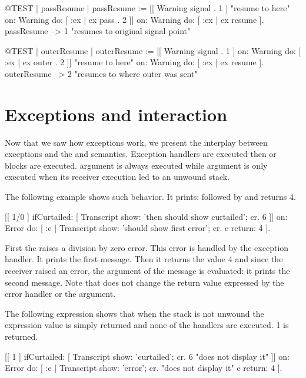 \begin{code}{@TEST | passResume |}
passResume := [[ Warning signal . 1 ]    "resume to here"
	on: Warning
	do: [ :ex | ex pass . 2 ]]
		on: Warning
		do: [ :ex | ex resume ].
passResume --> 1    "resumes to original signal point"
\end{code}

\begin{code}{@TEST | outerResume |}
outerResume := [[ Warning signal . 1 ]
	on: Warning
	do: [ :ex | ex outer . 2 ]]    "resume to here"
		on: Warning
		do: [ :ex | ex resume ].
outerResume --> 2    "resumes to where outer was sent"
\end{code}


\section{Exceptions and  interaction}

Now that we saw how exceptions work, we present the interplay between  exceptions and the  and  semantics. Exception handlers are executed then  or  blocks are executed.
 argument is always executed while  argument is only executed when its receiver execution led to an unwound stack. 


The following example shows such behavior.
It prints:  followed by  and returns 4.
 
\begin{code}{}
[[ 1/0 ] 
    ifCurtailed: [ Transcript show: 'then should show curtailed'; cr. 6 ]] 
	on: Error do: [ :e | 
		Transcript show: 'should show first error'; cr. 
		e return: 4 ].
\end{code}	

First the \ct{[1/0]} raises a division by zero error. This error is handled by the exception handler. It prints the first message. Then it returns the value 4 and since the 
receiver raised an error, the argument of the  message is evaluated: it prints the second message. Note that  does not change the return value expressed by the error handler or the  argument.

The following expression shows that when the stack is not unwound the expression value is simply returned and none of the handlers are executed. 1 is returned.
\begin{code}{}	
[[ 1 ] 
		ifCurtailed: [ Transcript show: 'curtailed'; cr. 6 "does not display it" ]] 
	on: Error do: [ :e | 
		Transcript show: 'error'; cr.  "does not display it"
		e return: 4 ].
\end{code}
	

